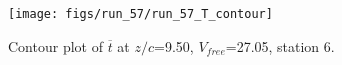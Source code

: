 \begin{figure}[H]
\centering
\texttt{[image: figs/run\_57/run\_57\_T\_contour]}
\caption{Contour plot of $\overline{t}$ at $z/c$=9.50, $V_{free}$=27.05, station 6.}
\label{fig:run_57_T_contour}
\end{figure}


